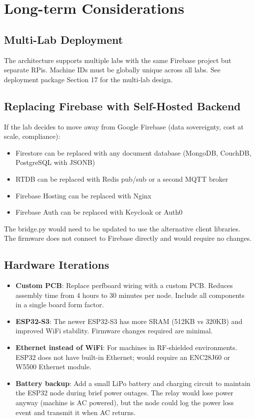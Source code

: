 \section{Long-term Considerations}

\subsection{Multi-Lab Deployment}

The architecture supports multiple labs with the same Firebase project but separate RPis. Machine IDs must be globally unique across all labs. See deployment package Section 17 for the multi-lab design.

\subsection{Replacing Firebase with Self-Hosted Backend}

If the lab decides to move away from Google Firebase (data sovereignty, cost at scale, compliance):
\begin{itemize}[leftmargin=1.5em]
    \item Firestore can be replaced with any document database (MongoDB, CouchDB, PostgreSQL with JSONB)
    \item RTDB can be replaced with Redis pub/sub or a second MQTT broker
    \item Firebase Hosting can be replaced with Nginx
    \item Firebase Auth can be replaced with Keycloak or Auth0
\end{itemize}

The bridge.py would need to be updated to use the alternative client libraries. The firmware does not connect to Firebase directly and would require no changes.

\subsection{Hardware Iterations}

\begin{itemize}[leftmargin=1.5em]
    \item \textbf{Custom PCB}: Replace perfboard wiring with a custom PCB. Reduces assembly time from 4 hours to 30 minutes per node. Include all components in a single board form factor.
    \item \textbf{ESP32-S3}: The newer ESP32-S3 has more SRAM (512KB vs 320KB) and improved WiFi stability. Firmware changes required are minimal.
    \item \textbf{Ethernet instead of WiFi}: For machines in RF-shielded environments. ESP32 does not have built-in Ethernet; would require an ENC28J60 or W5500 Ethernet module.
    \item \textbf{Battery backup}: Add a small LiPo battery and charging circuit to maintain the ESP32 node during brief power outages. The relay would lose power anyway (machine is AC powered), but the node could log the power loss event and transmit it when AC returns.
\end{itemize}

